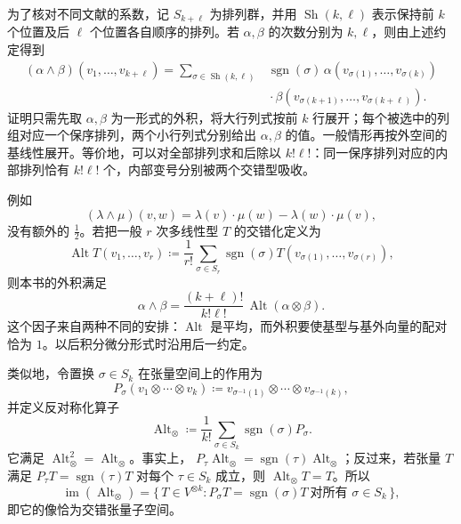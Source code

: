 为了核对不同文献的系数，记 \(S_{k+\ell}\) 为排列群，并用
\(\operatorname{Sh}(k,\ell)\) 表示保持前 \(k\) 个位置及后 \(\ell\) 个位置各自顺序的排列。若 \(\alpha,\beta\) 的次数分别为 \(k,\ell\)，则由上述约定得到
\begin{equation}\label{b1:eq:app-b-wedge-shuffle}
 \begin{aligned}
 (\alpha\wedge\beta)(v_1,\ldots,v_{k+\ell})
  =\sum_{\sigma\in\operatorname{Sh}(k,\ell)}
     &\operatorname{sgn}(\sigma)\,
       \alpha(v_{\sigma(1)},\ldots,v_{\sigma(k)})\\
     &{}\cdot
       \beta(v_{\sigma(k+1)},\ldots,v_{\sigma(k+\ell)}).
 \end{aligned}
\end{equation}
证明只需先取 \(\alpha,\beta\) 为一形式的外积，将大行列式按前 \(k\) 行展开；每个被选中的列组对应一个保序排列，两个小行列式分别给出 \(\alpha,\beta\) 的值。一般情形再按外空间的基线性展开。等价地，可以对全部排列求和后除以 \(k!\ell!\)：同一保序排列对应的内部排列恰有 \(k!\ell!\) 个，内部变号分别被两个交错型吸收。

\ProseParagraphBreak

例如
\[
 (\lambda\wedge\mu)(v,w)
   =\lambda(v)\cdot\mu(w)-\lambda(w)\cdot\mu(v),
\]
没有额外的 \(\frac12\)。若把一般 \(r\) 次多线性型 \(T\) 的交错化定义为
\[
 \operatorname{Alt}T(v_1,\ldots,v_r)
  \coloneqq\frac1{r!}\sum_{\sigma\in S_r}
       \operatorname{sgn}(\sigma)
       T(v_{\sigma(1)},\ldots,v_{\sigma(r)}),
\]
则本书的外积满足
\[
 \alpha\wedge\beta
   =\frac{(k+\ell)!}{k!\ell!}\,
      \operatorname{Alt}(\alpha\otimes\beta).
\]
这个因子来自两种不同的安排：\(\operatorname{Alt}\) 是平均，而外积要使基型与基外向量的配对恰为 \(1\)。以后积分微分形式时沿用后一约定。

\ProseParagraphBreak

类似地，令置换 \(\sigma\in S_k\) 在张量空间上的作用为
\[
 P_\sigma(v_1\otimes\cdots\otimes v_k)
 \coloneqq
 v_{\sigma^{-1}(1)}\otimes\cdots\otimes v_{\sigma^{-1}(k)},
\]
并定义反对称化算子
\[
 \operatorname{Alt}_{\otimes}
 \coloneqq
 \frac1{k!}\sum_{\sigma\in S_k}
   \operatorname{sgn}(\sigma)P_\sigma.
\]
它满足 \(\operatorname{Alt}_{\otimes}^2=\operatorname{Alt}_{\otimes}\)。事实上，
\(P_\tau\operatorname{Alt}_{\otimes}
=\operatorname{sgn}(\tau)\operatorname{Alt}_{\otimes}\)；反过来，若张量 \(T\) 满足
\(P_\tau T=\operatorname{sgn}(\tau)T\) 对每个 \(\tau\in S_k\) 成立，则
\(\operatorname{Alt}_{\otimes}T=T\)。所以
\[
 \operatorname{im}(\operatorname{Alt}_{\otimes})
 =\{\,T\in V^{\otimes k}:P_\sigma T
      =\operatorname{sgn}(\sigma)T\ \text{对所有 }\sigma\in S_k\,\},
\]
即它的像恰为交错张量子空间。

